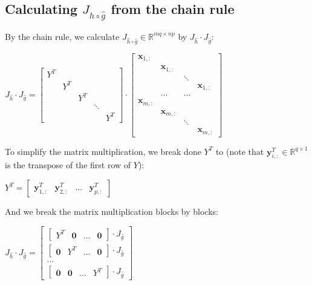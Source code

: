 \documentclass{article}
\begin{document}
\subsection{Calculating $J_{\widehat{h}\circ\widehat{g}} $ from the chain rule}
By the chain rule, we calculate $J_{\widehat{h}\circ\widehat{g}} \in \mathbb{R}^{mq \times np}$ by $J_{\widehat{h}}\cdot J_{\widehat{g}}$:
\begin{center}$
J_{\widehat{h}}\cdot J_{\widehat{g}}
=
\begin{bmatrix}
    Y^T \\ & Y^T \\ & & Y^T \\ & & & \ddots \\ & & & & Y^T
\end{bmatrix} \cdot 
\begin{bmatrix}
     \mathbf{x}_{1,:}  & &   &  \\
      & \mathbf{x}_{1,:} & &  \\
     &  & \ddots &\\
     &  &  & \mathbf{x}_{1,:}\\
     & \hdots& \hdots &\\
     \mathbf{x}_{m,:}  & &   &  \\
      & \mathbf{x}_{m,:} & &  \\
     &  & \ddots &\\
     &  &  & \mathbf{x}_{m,:}
\end{bmatrix}
$
\end{center}
To simplify the matrix multiplication, we break done $Y^T$ to (note that $\mathbf{y}_{i,:}^T \in \mathbb{R}^{q\times1}$ is the transpose of the first row of $Y$):
\begin{center}$
Y^T=\begin{bmatrix}
    \mathbf{y}_{1,:}^T & \mathbf{y}_{2,:}^T & \hdots & \mathbf{y}_{p,:}^T
\end{bmatrix} 
$\end{center}
And we break the matrix multiplication blocks by blocks:
\begin{center}
    $J_{\widehat{h}}\cdot J_{\widehat{g}}=
    \begin{bmatrix}
    \begin{bmatrix}Y^T & \textbf{0}& \hdots& \textbf{0}\end{bmatrix} \cdot J_{\widehat{g}}\\
    \begin{bmatrix}\textbf{0}& Y^T& \hdots& \textbf{0}\end{bmatrix} \cdot J_{\widehat{g}}\\
    \hdots     \\
     \begin{bmatrix}\textbf{0} & \textbf{0}& \hdots& Y^T\end{bmatrix} \cdot J_{\widehat{g}}   
    \end{bmatrix} 
    $
\end{center}
\end{document}
